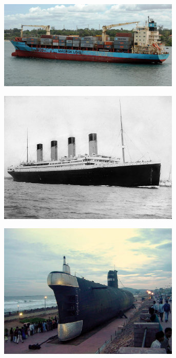\begin{figure}[h!]
\begin{subfigure}{0.333\textwidth}
        \includegraphics[height=0.15\textheight,width=0.95\textwidth]{images/intro_ood_anomaly/Anomaly_container.jpg}
        \caption{}
        \label{fig:anom_container}
    \end{subfigure}
    \begin{subfigure}{0.333\textwidth}
        \centering
        \includegraphics[height=0.15\textheight,width=0.95\textwidth]{images/intro_ood_anomaly/Anomaly_titanic.jpg}
        \caption{}
        \label{fig:anom_titanic}
    \end{subfigure}
    \begin{subfigure}{0.333\textwidth}
        \centering
        \includegraphics[height=0.15\textheight,width=0.95\textwidth]{images/intro_ood_anomaly/ood_submarine.jpg}

\end{subfigure}
\end{figure}
